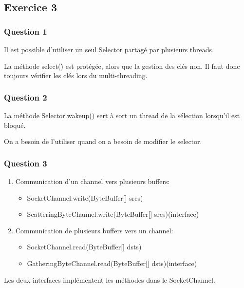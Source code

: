 \subsection{Exercice 3}

\subsubsection{Question 1}

Il est possible d'utiliser un seul Selector partag\'e par
plusieurs threads.

La m\'ethode select(\`) est prot\'eg\'ee, alors que la
gestion des cl\'es non. Il faut donc toujours v\'erifier
les cl\'es lors du multi-threading.

\subsubsection{Question 2}

La m\'ethode Selector.wakeup() sert \`a sort un thread
de la s\'election lorsqu'il est bloqu\'e.

On a besoin de l'utiliser quand on a besoin de modifier
le selector.

\subsubsection{Question 3}

\begin{enumerate}
  \item Communication d'un channel vers plusieurs buffers:
  \begin{itemize}
    \item SocketChannel.write(ByteBuffer[] srcs)
    \item ScatteringByteChannel.write(ByteBuffer[] srcs)(interface)
  \end{itemize}
  \item Communication de plusieurs buffers vers un channel:
  \begin{itemize}
    \item SocketChannel.read(ByteBuffer[] dsts)
    \item GatheringByteChannel.read(ByteBuffer[] dsts)(interface)
  \end{itemize}
\end{enumerate}

Les deux interfaces impl\'ementent les m\'ethodes dans
le SocketChannel.
